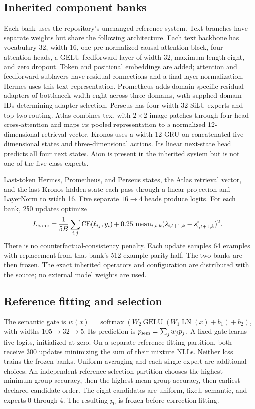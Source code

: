 \subsection{Inherited component banks}
Each bank uses the repository's unchanged reference system. Text branches have
separate weights but share the following architecture. Each text backbone
has vocabulary 32, width 16, one pre-normalized causal attention block, four
attention heads, a GELU feedforward layer of width 32, maximum length eight,
and zero dropout. Token and positional embeddings are added; attention and
feedforward sublayers have residual connections and a final layer normalization.
Hermes uses this text representation. Prometheus adds domain-specific residual
adapters of bottleneck width eight across three domains, with supplied domain
IDs determining adapter selection. Perseus has four width-32 SiLU experts and
top-two routing. Atlas combines text with $2\times2$ image patches through
four-head cross-attention and maps its pooled representation to a normalized
12-dimensional retrieval vector. Kronos uses a width-12 GRU on concatenated
five-dimensional states and three-dimensional actions. Its linear next-state
head predicts all four next states. Aion is present in the inherited system
but is not one of the five class experts.

Last-token Hermes, Prometheus, and Perseus states, the Atlas retrieval vector,
and the last Kronos hidden state each pass through a linear projection and
LayerNorm to width 16. Five separate $16\to4$ heads produce logits. For each
bank, 250 updates optimize
\begin{equation}
 L_{\rm bank}=\frac1{5B}\sum_{i,j}\operatorname{CE}(\ell_{ij},y_i)
 +0.25\,\operatorname{mean}_{i,t,k}(\hat s_{i,t+1,k}-s^*_{i,t+1,k})^2.
\end{equation}
There is no counterfactual-consistency penalty. Each update samples 64 examples
with replacement from that bank's 512-example parity half. The two banks are
then frozen. The exact inherited operators and configuration are distributed
with the source; no external model weights are used.

\subsection{Reference fitting and selection}
The semantic gate is $w(x)=\operatorname{softmax}(W_2\operatorname{GELU}
(W_1\operatorname{LN}(x)+b_1)+b_2)$, with widths $105\to32\to5$.
Its prediction is $p_{\rm sem}=\sum_jw_jp_j$. A fixed gate learns five logits,
initialized at zero. On a separate reference-fitting partition, both receive
300 updates minimizing the sum of their mixture NLLs. Neither loss trains the
frozen banks. Uniform averaging and each single expert are additional choices.
An independent reference-selection partition chooses the highest minimum
group accuracy, then the highest mean group accuracy, then earliest declared
candidate order. The eight candidates are uniform, fixed, semantic, and experts
0 through 4. The resulting $p_0$ is frozen before correction fitting.

